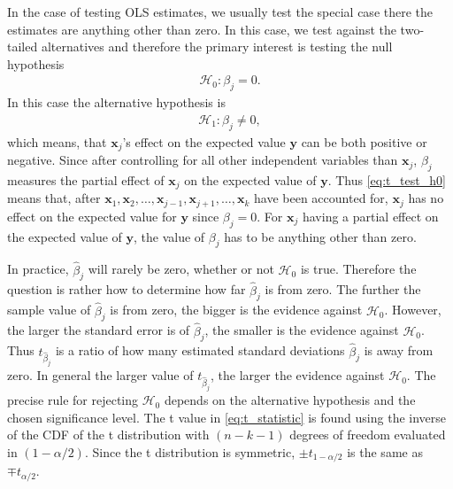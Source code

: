In the case of testing OLS estimates, we usually test the special case there the estimates are anything other than zero. In this case, we test against the two-tailed alternatives and therefore the primary interest is testing the null hypothesis
\begin{align} \label{eq:t_test_h0}
    \mathcal{H}_0:\beta_j=0.
\end{align}
In this case the alternative hypothesis is
\begin{align} \label{eq:t_test_ha}
    \mathcal{H}_1 : \beta_j \neq 0,
\end{align}
which means, that $\textbf{x}_j$'s effect on the expected value $\textbf{y}$ can be both positive or negative.
Since after controlling for all other independent variables than $\textbf{x}_j$, $\beta_j$ measures the partial effect of $\textbf{x}_j$ on the expected value of $\textbf{y}$. 
Thus \eqref{eq:t_test_h0} means that, after $\textbf{x}_1,\textbf{x}_2, \ldots, \textbf{x}_{j-1}, \textbf{x}_{j+1}, \ldots, \textbf{x}_k$ have been accounted for, $\textbf{x}_j$ has no effect on the expected value for $\textbf{y}$ since $\beta_j=0$. 
For $\textbf{x}_j$ having a partial effect on the expected value of $\textbf{y}$, the value of $\beta_j$ has to be anything other than zero.

In practice, $\hat{\beta}_j$ will rarely be zero, whether or not $\mathcal{H}_0$ is true.
Therefore the question is rather how to determine how far $\hat{\beta}_j$ is from zero. 
The further the sample value of $\hat{\beta}_j$ is from zero, the bigger is the evidence against $\mathcal{H}_0$. 
However, the larger the standard error is of $\hat{\beta}_j$, the smaller is the evidence against $\mathcal{H}_0$. 
Thus $t_{\hat{\beta}_j}$ is a ratio of how many estimated standard deviations $\hat{\beta}_j$ is away from zero.
In general the larger value of $t_{\hat{\beta}_j}$, the larger the evidence against $\mathcal{H}_0$. 
The precise rule for rejecting $\mathcal{H}_0$ depends on the alternative hypothesis and the chosen significance level.
The t value in \eqref{eq:t_statistic} is found using the inverse of the CDF of the t distribution with $(n - k - 1)$ degrees of freedom evaluated in $(1-\alpha/2)$. 
Since the t distribution is symmetric, $\pm t_{1-\alpha/2}$ is the same as $\mp t_{\alpha/2}$.

